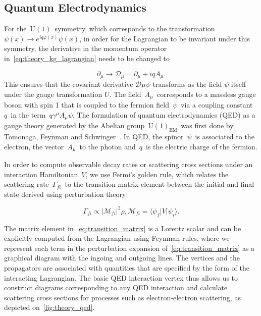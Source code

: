 \subsection{Quantum Electrodynamics}
For the~$\mathrm{U}(1)$~symmetry, which corresponds to the transformation~$\psi(x) \rightarrow e^{i q\varphi(x)} \psi(x)$, in order for the Lagrangian to be invariant under this symmetry, the derivative in the momentum operator in~\cref{eq:theory_kg_lagrangian} needs to be changed to

\begin{equation}
\partial_{\mu} \rightarrow \mathcal{D}_{\mu} = \partial_{\mu} + i q A_{\mu}.
\end{equation}
This ensures that the covariant derivative $\mathcal{D}{\mu}\psi$ transforms as the field $\psi$ itself under the gauge transformation $U$.
The field~$A_{\mu}$~corresponds to a massless gauge boson with spin 1 that is coupled to the fermion field~$\psi$~via a coupling constant~$q$~in the term~$q \gamma^\mu A_\mu \psi$. The formulation of quantum electrodynamics (QED) as a gauge theory generated by the Abelian group~$\mathrm{U}(1)_{\mathrm{EM}}$~was first done by Tomonaga, Feynman and Schwinger~\cite{PhysRev.73.416, PhysRev.74.1439, PhysRev.76.769}. In QED, the spinor~$\psi$~is associated to the electron, the vector~$A_\mu$~to the photon and~$q$~is the electric charge of the fermion. 

In order to compute observable decay rates or scattering cross sections under an interaction Hamiltonian~$V$, we use Fermi's golden rule, which relates the scattering rate~$\Gamma_{fi}$~to the transition matrix element between the initial and final state derived using perturbation theory:

\begin{equation}
\label{eq:transition_matrix}
\Gamma_{fi} \propto |\mathcal{M}_{fi}|^2 \rho, \mathcal{M}_{fi} = \langle \psi_f | V | \psi_i \rangle.
\end{equation}

The matrix element in~\cref{eq:transition_matrix} is a Lorentz scalar and can be explicitly computed from the Lagrangian using Feynman rules, where we represent each term in the perturbation expansion of~\cref{eq:transition_matrix} as a graphical diagram with the ingoing and outgoing lines. The vertices and the propagators are associated with quantities that are specified by the form of the interacting Lagrangian. The basic QED interaction vertex thus allows us to construct diagrams corresponding to any QED interaction and calculate scattering cross sections for processes such as electron-electron scattering, as depicted on~\cref{fig:theory_qed}.

